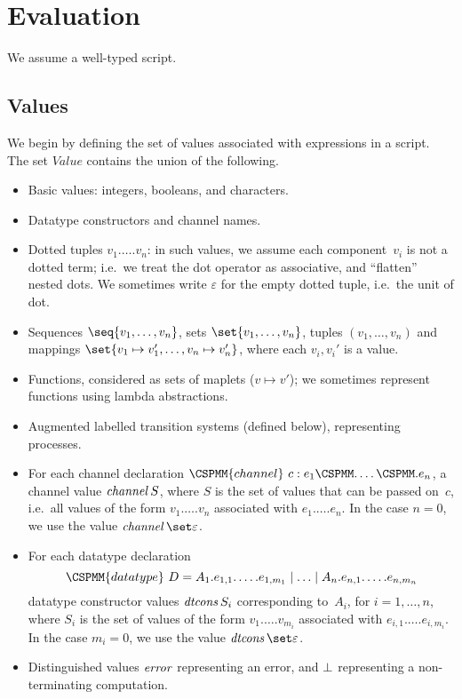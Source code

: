 \section{Evaluation}

We assume a well-typed script.


\subsection{Values}

We begin by defining the set of values associated with expressions in a
script.  The set $Value$ contains the union of the following. 
%
\begin{itemize}
\item Basic values: integers, booleans, and characters.

\item Datatype constructors and channel names.

\item Dotted tuples $v_1.\ldots.v_n$: in such values, we assume each
  component~$v_i$ is not a dotted term; i.e.~we treat the dot operator as
  associative, and ``flatten'' nested dots.  We sometimes write $\varepsilon$
  for the empty dotted tuple, i.e.~the unit of dot.

\item Sequences $\seq{v_1,\ldots,v_n}$, sets
  $\set{v_1,\ldots,v_n}$, tuples $(v_1,\ldots,v_n)$ and mappings
  $\set{v_1 \mapsto v_1', \ldots, v_n \mapsto v_n'}$, where each $v_i, v_i'$
  is a value.

\item Functions, considered as sets of maplets ($v \mapsto v'$); we sometimes
  represent functions using lambda abstractions.

\item Augmented labelled transition systems (defined below), representing
  processes.

\item For each channel declaration $\CSPMM{channel}~c : e_1\M.\ldots\M.e_n$, a
  channel value $\mathop{\it channel} S$, where $S$ is the set of values that can be
  passed on~$c$, i.e.~all values of the form $v_1.\ldots.v_n$ associated with
  $e_1.\ldots.e_n$.  In the case $n=0$, we use the value
  $\channel \set\varepsilon$.  

\item For each datatype declaration
\[
\CSPMM{datatype}~D = 
  A_1.e_{1,1}.\ldots.e_{1,m_1} \mid \ldots \mid A_n.e_{n,1}.\ldots.e_{n,m_n}
\]
datatype constructor values $\mathop{\it dtcons} S_i$ corresponding to~$A_i$, for
$i = 1,\ldots,n$, where $S_i$ is the set of values of the form
$v_1.\ldots.v_{m_i}$ associated with $e_{i,1}.\ldots.e_{i,m_i}$.  In the case
$m_i=0$, we use the value $\dtcons\set\varepsilon$.

\item Distinguished values $\mathord{\it error}$ representing an error, and $\perp$
  representing a non-terminating computation.
\end{itemize}

